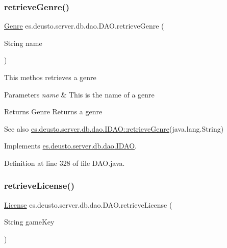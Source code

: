 \subsubsection{\texorpdfstring{retrieve\+Genre()}{retrieveGenre()}}
{\footnotesize\ttfamily \hyperlink{classes_1_1deusto_1_1server_1_1db_1_1data_1_1_genre}{Genre} es.\+deusto.\+server.\+db.\+dao.\+D\+A\+O.\+retrieve\+Genre (\begin{DoxyParamCaption}\item[{String}]{name }\end{DoxyParamCaption})}

This methos retrieves a genre 
\begin{DoxyParams}{Parameters}
{\em name} & This is the name of a genre \\
\hline
\end{DoxyParams}
\begin{DoxyReturn}{Returns}
Genre Returns a genre 
\end{DoxyReturn}
\begin{DoxySeeAlso}{See also}
\hyperlink{interfacees_1_1deusto_1_1server_1_1db_1_1dao_1_1_i_d_a_o_a8b15955637f9b81c57900761c6d03571}{es.\+deusto.\+server.\+db.\+dao.\+I\+D\+A\+O\+::retrieve\+Genre}(java.\+lang.\+String) 
\end{DoxySeeAlso}


Implements \hyperlink{interfacees_1_1deusto_1_1server_1_1db_1_1dao_1_1_i_d_a_o_a8b15955637f9b81c57900761c6d03571}{es.\+deusto.\+server.\+db.\+dao.\+I\+D\+AO}.



Definition at line 328 of file D\+A\+O.\+java.

\mbox{\label{classes_1_1deusto_1_1server_1_1db_1_1dao_1_1_d_a_o_a02fd634e6bd7a087b1476ab161af646f}} 
\subsubsection{\texorpdfstring{retrieve\+License()}{retrieveLicense()}}
{\footnotesize\ttfamily \hyperlink{classes_1_1deusto_1_1server_1_1db_1_1data_1_1_license}{License} es.\+deusto.\+server.\+db.\+dao.\+D\+A\+O.\+retrieve\+License (\begin{DoxyParamCaption}\item[{String}]{game\+Key }\end{DoxyParamCaption})}

